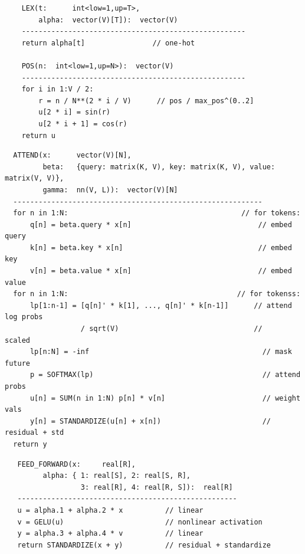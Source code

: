 \documentclass[9pt]{report}
\begin{document}
{
\footnotesize
\begin{center}
\begin{verbatim}
    LEX(t:      int<low=1,up=T>,
        alpha:  vector(V)[T]):  vector(V)  
    -----------------------------------------------------
    return alpha[t]                // one-hot

    POS(n:  int<low=1,up=N>):  vector(V)
    -----------------------------------------------------
    for i in 1:V / 2:
        r = n / N**(2 * i / V)      // pos / max_pos^(0..2]
        u[2 * i] = sin(r)
        u[2 * i + 1] = cos(r)
    return u
\end{verbatim}
\end{center}

\footnotesize
\begin{center}
\begin{verbatim}
  ATTEND(x:      vector(V)[N],
         beta:   {query: matrix(K, V), key: matrix(K, V), value: matrix(V, V)},
         gamma:  nn(V, L)):  vector(V)[N]
  -----------------------------------------------------------
  for n in 1:N:                                         // for tokens:
      q[n] = beta.query * x[n]                              // embed query
      k[n] = beta.key * x[n]                                // embed key
      v[n] = beta.value * x[n]                              // embed value
  for n in 1:N:                                        // for tokenss:
      lp[1:n-1] = [q[n]' * k[1], ..., q[n]' * k[n-1]]      // attend log probs
                  / sqrt(V)                                //     scaled
      lp[n:N] = -inf                                         // mask future
      p = SOFTMAX(lp)                                        // attend probs
      u[n] = SUM(n in 1:N) p[n] * v[n]                       // weight vals
      y[n] = STANDARDIZE(u[n] + x[n])                        // residual + std
  return y
\end{verbatim}
\end{center}

\footnotesize
\vspace*{-6pt}
\begin{verbatim}
   FEED_FORWARD(x:     real[R], 
         alpha: { 1: real[S], 2: real[S, R], 
                  3: real[R], 4: real[R, S]):  real[R]
   ----------------------------------------------------
   u = alpha.1 + alpha.2 * x          // linear
   v = GELU(u)                        // nonlinear activation
   y = alpha.3 + alpha.4 * v          // linear
   return STANDARDIZE(x + y)          // residual + standardize


\end{verbatim}}
\end{document}
